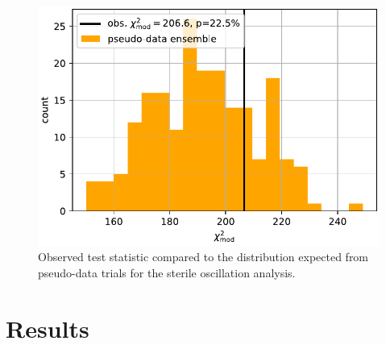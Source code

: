 \begin{figure}
    \centering
    \includegraphics[width=0.8\linewidth]{figures/measurement/sterile_analysis/results/compare_ts_to_ensemble_REAL_DATA_FIT_v12_ext_holeice.pdf}
    \caption{Observed test statistic compared to the distribution expected from pseudo-data trials for the sterile oscillation analysis.}
    \label{fig:sterile-modchi2-ensemble-comparison}
\end{figure}

\section{Results}

